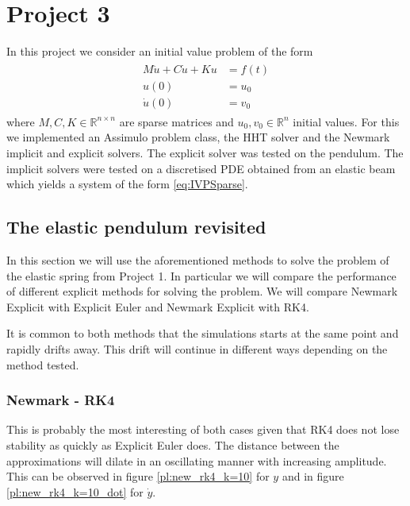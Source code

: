 \documentclass{report}
\def\R{\mathbb{R}}
\begin{document}
\chapter*{Project 3}

In this project we consider an initial value problem of the form
\begin{align}
	\begin{aligned}
	M \ddot{u}+C\dot{u}+Ku &= f(t) \\
	u(0) &= u_0 \\
	\dot{u}(0) &= v_0
	\end{aligned}
	\label{eq:IVPSparse}
\end{align}
where $M, C, K\in\R^{n\times n}$ are sparse matrices and $u_0, v_0\in\R^n$ initial values. For this we implemented an Assimulo problem class, the HHT solver and the Newmark implicit and explicit solvers. The explicit solver was tested on the pendulum. The implicit solvers were tested on a discretised PDE obtained from an elastic beam which yields a system of the form \eqref{eq:IVPSparse}.

\section*{The elastic pendulum revisited}

In this section we will use the aforementioned methods to solve the problem of the elastic spring from Project 1. In particular we will compare the performance of different explicit methods for solving the problem. We will compare Newmark Explicit with Explicit Euler and Newmark Explicit with RK4.

It is common to both methods that the simulations starts at the same point and rapidly drifts away. This drift will continue in different ways depending on the method tested.

\subsection*{Newmark - RK4}

This is probably the most interesting of both cases given that RK4 does not lose stability as quickly as Explicit Euler does. The distance between the approximations will dilate in an oscillating manner with increasing amplitude. This can be observed in figure \ref{pl:new_rk4_k=10} for $y$ and in figure \ref{pl:new_rk4_k=10_dot} for $\dot{y}$.
\end{document}
